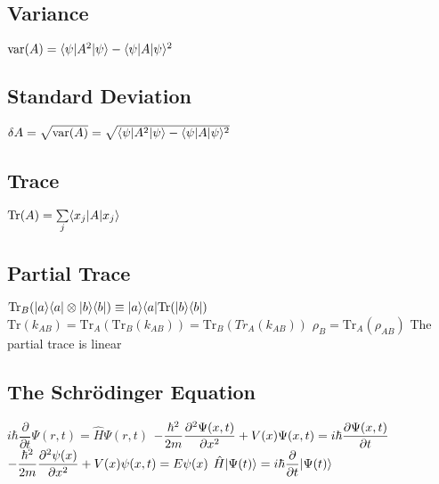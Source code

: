 \subsection{Variance}
\begin{itemize}
\itemt \( \mathrm{var}(A) = \langle\psi\rvert A^2 \lvert\psi\rangle - \langle\psi\rvert A \lvert\psi\rangle^2 \)
\end{itemize}	

\subsection{Standard Deviation}
\begin{itemize}
\itemt \( \delta A = \sqrt{\mathrm{var}(A)} = \sqrt{\langle\psi\rvert A^2 \lvert\psi\rangle - \langle\psi\rvert A \lvert\psi\rangle^2} \)
\end{itemize}

\subsection{Trace}
\begin{itemize}
\itemt \( \mathrm{Tr} (A) = \sum\limits_{j} \langle x_j\rvert A \lvert x_j\rangle \)
\end{itemize}

\subsection{Partial Trace}			
\begin{itemize}
\itemt \( \mathrm{Tr}_B(\lvert a\rangle\langle a\rvert\otimes\lvert b\rangle\langle b\rvert) \equiv \lvert a\rangle\langle a\rvert \mathrm{Tr} (\lvert b\rangle\langle b\rvert) \)
\itemt \( \mathrm{Tr} (k_{AB}) = \mathrm{Tr}_A(\mathrm{Tr}_B(k_{AB})) = \mathrm{Tr}_B(Tr_A(k_{AB})) \)
\itemt \( \rho_B = \mathrm{Tr}_A(\rho_{AB}) \)
\itemt The partial trace is linear
\end{itemize}

\subsection{The Schr\"odinger Equation}			
\begin{itemize}
\itemt \( i \hbar \dfrac{\partial }{\partial t} \Psi (r,t) = \hat{H} \Psi(r,t) \)
\itemt \( -\dfrac{\hbar^2}{2m} \dfrac{\partial ^2 \Psi(x,t)}{\partial x^2} + V(x)\Psi(x,t) = i\hbar\dfrac{\partial \Psi(x,t)}{\partial t} \)
\itemt \( -\dfrac{\hbar^2}{2m} \dfrac{\partial ^2 \psi(x)}{\partial x^2} + V(x)\psi(x,t) = E\psi(x) \)
\itemt \( \hat{H}\lvert\Psi(t)\rangle = i\hbar \dfrac{\partial }{\partial t} \lvert\Psi(t)\rangle \)
\end{itemize}

